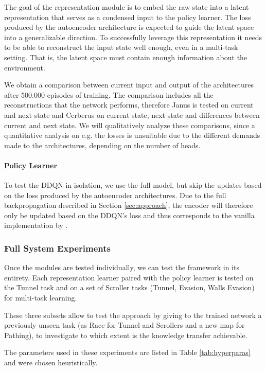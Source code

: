The goal of the representation module is to embed the raw state into a latent representation that serves as a condensed input to the policy learner. The loss produced by the autoencoder architecture is expected to guide the latent space into a generalizable direction. To successfully leverage this representation it needs to be able to reconstruct the input state well enough, even in a multi-task setting. That is, the latent space must contain enough information about the environment.

We obtain a comparison between current input and output of the architectures after 500.000 episodes of training. The comparison includes all the reconstructions that the network performs, therefore Janus is tested on current and next state and Cerberus on current state, next state and differences between current and next state. We will qualitatively analyze these comparisons, since a quantitative analysis on e.g. the losses is unsuitable due to the different demands made to the architectures, depending on the number of heads. 

\paragraph{Policy Learner}
To test the DDQN in isolation, we use the full model, but skip the updates based on the loss produced by the autoencoder architectures. Due to the full backpropagation described in Section \ref{sec:approach}, the encoder will therefore only be updated based on the DDQN's loss and thus corresponds to the vanilla implementation by \citet{DQN}. 

\subsubsection{Full System Experiments}
Once the modules are tested individually, we can test the framework in its entirety.
Each representation learner paired with the policy learner is tested on the Tunnel task and on a set of Scroller tasks (Tunnel, Evasion, Walls Evasion) for multi-task learning.

These three subsets allow to test the approach by giving to the trained network a previously unseen task (as Race for Tunnel and Scrollers and a new map for Pathing), to investigate to which extent is the knowledge transfer achievable.


The parameters used in these experiments are listed in Table \ref{tab:hyperparas} and were chosen heuristically.

